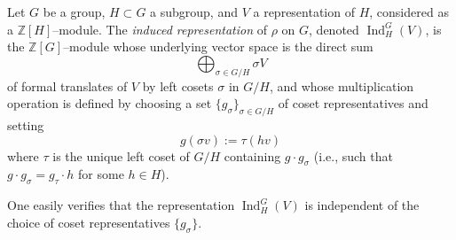 \documentclass{article}
\begin{document}
Let $G$ be a group, $H \subset G$ a subgroup, and $V$ a representation of $H$, considered as a $\mathbb{Z}[H]$--module. The {\em induced representation} of $\rho$ on $G$, denoted $\operatorname{Ind}_H^G(V)$, is the $\mathbb{Z}[G]$--module whose underlying vector space is the direct sum
$$
\bigoplus_{\sigma \in G/H} \sigma V
$$
of formal translates of $V$ by left cosets $\sigma$ in $G/H$, and whose multiplication operation is defined by choosing a set $\{g_\sigma\}_{\sigma \in G/H}$ of coset representatives and setting
$$
g(\sigma v) := \tau (h v)
$$
where $\tau$ is the unique left coset of $G/H$ containing $g \cdot g_\sigma$ (i.e., such that $g \cdot g_\sigma = g_\tau \cdot h$ for some $h \in H$).

One easily verifies that the representation $\operatorname{Ind}_H^G(V)$ is independent of the choice of coset representatives $\{g_\sigma\}$.
\end{document}

